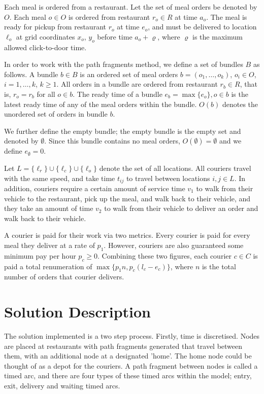 \documentclass{article}
\begin{document}
Each meal is ordered from a restaurant. Let the set of meal orders be denoted by $O$. Each meal $o\in O$ is ordered from restaurant $r_o\in R$ at time $a_o$. The meal is ready for pickup from restaurant $r_o$ at time $e_o$, and must be delivered to location $\ell_o$ at grid coordinates $x_o$, $y_o$ before time $a_o+\varrho$, where $\varrho$ is the maximum allowed click-to-door time.

In order to work with the path fragments method, we define a set of bundles $B$ as follows. A bundle $b\in B$ is an ordered set of meal orders $b=(o_1, \dots, o_k)$, $o_i\in O$, $i=1,\dots,k$, $k\geq 1$. All orders in a bundle are ordered from restaurant $r_b\in R$, that is, $r_o=r_b$ for all $o\in b$. The ready time of a bundle $e_b=\max\{e_o\}, o\in b$ is the latest ready time of any of the meal orders within the bundle. $O(b)$ denotes the unordered set of orders in bundle $b$.

We further define the empty bundle; the empty bundle is the empty set and denoted by $\emptyset$. Since this bundle contains no meal orders, $O(\emptyset)=\emptyset$ and we define $e_\emptyset=0$.

Let $L=\{\ell_r\}\cup\{\ell_c\}\cup\{\ell_o\}$ denote the set of all locations. All couriers travel with the same speed, and take time $t_{ij}$ to travel between locations $i,j\in L$. In addition, couriers require a certain amount of service time $v_1$ to walk from their vehicle to the restaurant, pick up the meal, and walk back to their vehicle, and they take an amount of time $v_2$ to walk from their vehicle to deliver an order and walk back to their vehicle.

A courier is paid for their work via two metrics. Every courier is paid for every meal they deliver at a rate of $p_1$. However, couriers are also guaranteed some minimum pay per hour $p_c\geq 0$. Combining these two figures, each courier $c\in C$ is paid a total renumeration of $\max\{p_1n, p_c(l_c-e_c)\}$, where $n$ is the total number of orders that courier delivers.

\section{Solution Description}

The solution implemented is a two step process. Firstly, time is discretised. Nodes are placed at restaurants with path fragments generated that travel between them, with an additional node at a designated 'home'. The home node could be thought of as a depot for the couriers. A path fragment between nodes is called a timed arc, and there are four types of these timed arcs within the model; entry, exit, delivery and waiting timed arcs.
\end{document}
